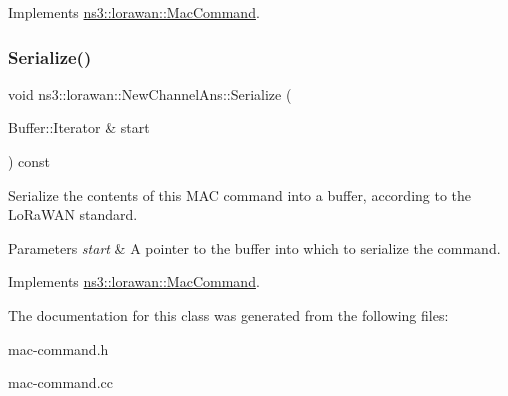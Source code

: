Implements \hyperlink{classns3_1_1lorawan_1_1MacCommand_a6bf88db38dab7dcd817811a9fb59f920}{ns3\+::lorawan\+::\+Mac\+Command}.

\mbox{\label{classns3_1_1lorawan_1_1NewChannelAns_a399acb39006cf6d23e19b359385c48b0}} 
\subsubsection{\texorpdfstring{Serialize()}{Serialize()}}
{\footnotesize\ttfamily void ns3\+::lorawan\+::\+New\+Channel\+Ans\+::\+Serialize (\begin{DoxyParamCaption}\item[{Buffer\+::\+Iterator \&}]{start }\end{DoxyParamCaption}) const\hspace{0.3cm}{\ttfamily [virtual]}}

Serialize the contents of this M\+AC command into a buffer, according to the Lo\+Ra\+W\+AN standard.


\begin{DoxyParams}{Parameters}
{\em start} & A pointer to the buffer into which to serialize the command. \\
\hline
\end{DoxyParams}


Implements \hyperlink{classns3_1_1lorawan_1_1MacCommand_a0ed44b33942ddc3dc9694dc06ab0b87f}{ns3\+::lorawan\+::\+Mac\+Command}.



The documentation for this class was generated from the following files\+:\begin{DoxyCompactItemize}
\item 
mac-\/command.\+h\item 
mac-\/command.\+cc\end{DoxyCompactItemize}
